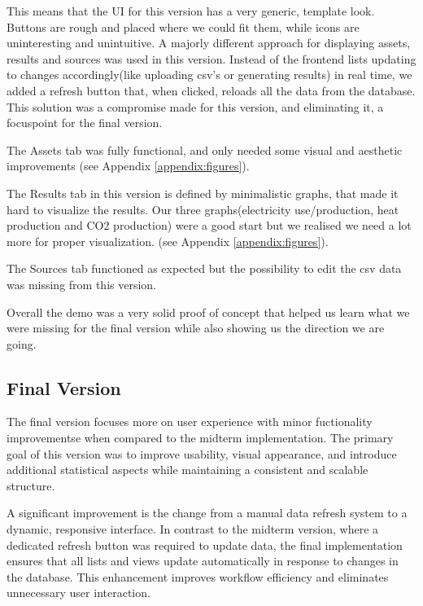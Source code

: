 \hspace*{1cm}This means that the UI for this version has a very generic, template look. Buttons are rough and placed where we could fit them, while icons are uninteresting and unintuitive. A majorly different approach for displaying assets, results and sources was used in this version. Instead of the frontend lists updating to changes accordingly(like uploading csv's or generating results) in real time, we added a refresh button that, when clicked, reloads all the data from the database. This solution was a compromise made for this version, and eliminating it, a focuspoint for the final version.

\hspace*{1cm}The Assets tab was fully functional, and only needed some visual and aesthetic improvements (see Appendix \ref{appendix:figures}).

\hspace*{1cm}The Results tab in this version is defined by minimalistic graphs, that made it hard to visualize the results. Our three graphs(electricity use/production, heat production and CO2 production) were a good start but we realised we need a lot more for proper visualization. (see Appendix \ref{appendix:figures}).

\hspace*{1cm}The Sources tab functioned as expected but the possibility to edit the csv data was missing from this version.

\hspace*{1cm}Overall the demo was a very solid proof of concept that helped us learn what we were missing for the final version while also showing us the direction we are going.
	
\subsection{Final Version}
\hspace*{1cm}The final version focuses more on user experience with minor fuctionality improvementse when compared to the midterm implementation. The primary goal of this version was to improve usability, visual appearance, and introduce additional statistical aspects while maintaining a consistent and scalable structure. 

\hspace*{1cm}A significant improvement is the change from a manual data refresh system to a dynamic, responsive interface. In contrast to the midterm version, where a dedicated refresh button was required to update data, the final implementation ensures that all lists and views update automatically in response to changes in the database. This enhancement improves workflow efficiency and eliminates unnecessary user interaction.

